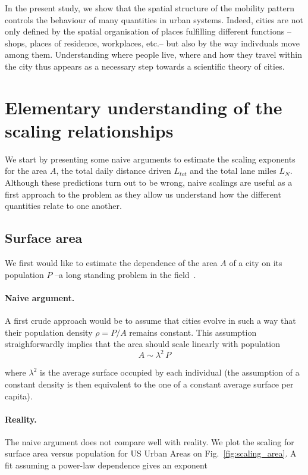 In the present study, we show that the spatial structure of the mobility pattern
controls the behaviour of many quantities in urban systems. Indeed, cities are
not only defined by the spatial organisation of places fulfilling different
functions --shops, places of residence, workplaces, etc.-- but also by the way
indivduals move among them. Understanding where people live, where and how they
travel within the city thus appears as a necessary step towards a scientific
theory of cities.\\ 

\section{Elementary understanding of the scaling relationships}
\label{sec:elementary_understanding_of_the_scaling_relationships}

We start by presenting some naive arguments to estimate the scaling exponents
for the area $A$, the total daily distance driven $L_{tot}$ and the total lane
miles $L_N$. Although these predictions turn out to be wrong, naive scalings are
useful as a first approach to the problem as they allow us understand how the
different quantities relate to one another.

\subsection{Surface area}

We first would like to estimate the dependence of the area
$A$ of a city on its population $P$ --a long standing problem in the
field~\cite{Stewart:1947, Batty:2011}.

\paragraph{Naive argument.}  A first crude approach would be to assume
that cities evolve in such a way that their population density $\rho = P/A$
remains constant. This assumption straighforwardly implies that the area should
scale linearly with population
%
\begin{equation} 
    A \sim \lambda^2\, P 
    \label{eq:area_naive} 
\end{equation}

where $\lambda^2$ is the average surface occupied by each individual (the
assumption of a constant density is then equivalent to the one of a constant
average surface per capita).

\paragraph{Reality.} The naive argument does not compare well with reality. We
plot the scaling for surface area versus population for US Urban Areas on
Fig.~\ref{fig:scaling_area}. A fit assuming a power-law dependence gives an exponent

